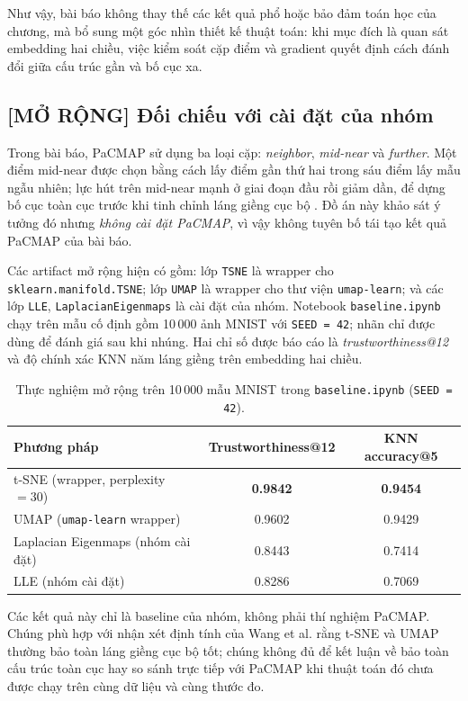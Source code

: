 Như vậy, bài báo không thay thế các kết quả phổ hoặc bảo đảm toán học của
chương, mà bổ sung một góc nhìn thiết kế thuật toán: khi mục đích là quan
sát embedding hai chiều, việc kiểm soát cặp điểm và gradient quyết định
cách đánh đổi giữa cấu trúc gần và bố cục xa.

\subsection{[MỞ RỘNG] Đối chiếu với cài đặt của nhóm}

Trong bài báo, PaCMAP sử dụng ba loại cặp: \textit{neighbor},
\textit{mid-near} và \textit{further}. Một điểm mid-near được chọn bằng
cách lấy điểm gần thứ hai trong sáu điểm lấy mẫu ngẫu nhiên; lực hút trên
mid-near mạnh ở giai đoạn đầu rồi giảm dần, để dựng bố cục toàn cục trước
khi tinh chỉnh láng giềng cục bộ \cite{wang2021pacmap}. Đồ án này khảo sát
ý tưởng đó nhưng \emph{không cài đặt PaCMAP}, vì vậy không tuyên bố tái tạo
kết quả PaCMAP của bài báo.

Các artifact mở rộng hiện có gồm: lớp \texttt{TSNE} là wrapper cho
\texttt{sklearn.manifold.TSNE}; lớp \texttt{UMAP} là wrapper cho thư viện
\texttt{umap-learn}; và các lớp \texttt{LLE}, \texttt{LaplacianEigenmaps}
là cài đặt của nhóm. Notebook \texttt{baseline.ipynb} chạy trên mẫu cố định
gồm 10\,000 ảnh MNIST với \texttt{SEED = 42}; nhãn chỉ được dùng để đánh
giá sau khi nhúng. Hai chỉ số được báo cáo là
\textit{trustworthiness@12} và độ chính xác KNN năm láng giềng trên
embedding hai chiều.

\begin{table}[H]
  \centering
  \caption{Thực nghiệm mở rộng trên 10\,000 mẫu MNIST trong
  \texttt{baseline.ipynb} (\texttt{SEED = 42}).}
  \label{tab:bonus-tsne-umap}
  \begin{tabular}{lcc}
    \toprule
    Phương pháp & Trustworthiness@12 & KNN accuracy@5 \\
    \midrule
    t-SNE (wrapper, perplexity $=30$) & \textbf{0.9842} & \textbf{0.9454} \\
    UMAP (\texttt{umap-learn} wrapper) & 0.9602 & 0.9429 \\
    Laplacian Eigenmaps (nhóm cài đặt) & 0.8443 & 0.7414 \\
    LLE (nhóm cài đặt) & 0.8286 & 0.7069 \\
    \bottomrule
  \end{tabular}
\end{table}

Các kết quả này chỉ là baseline của nhóm, không phải thí nghiệm PaCMAP.
Chúng phù hợp với nhận xét định tính của Wang et al. rằng t-SNE và UMAP
thường bảo toàn láng giềng cục bộ tốt; chúng không đủ để kết luận về bảo
toàn cấu trúc toàn cục hay so sánh trực tiếp với PaCMAP khi thuật toán đó
chưa được chạy trên cùng dữ liệu và cùng thước đo.

